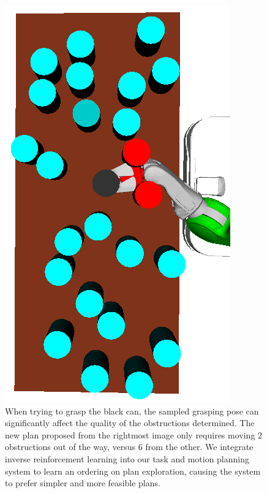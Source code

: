 \begin{figure}[t]
    \includegraphics[scale=0.17, angle=270]{images/grasp_teaser_good.png}
  \caption{\small{When trying to grasp the black can, the sampled grasping pose can
      significantly affect the quality of the obstructions determined. The new plan proposed from the rightmost image only
      requires moving 2 obstructions out of the way, versus 6 from the other. We integrate inverse reinforcement learning into our task and
      motion planning system to learn an ordering on plan exploration, causing the system to prefer simpler and more feasible plans.}}
  \label{fig:hlsearch}
\end{figure}

